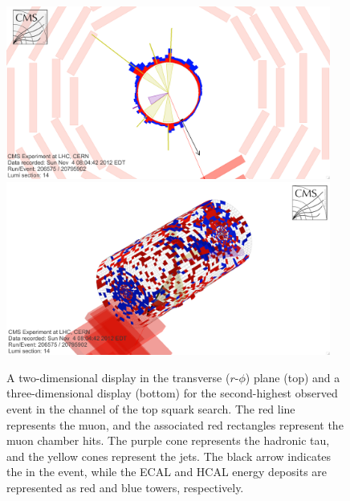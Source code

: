 \begin{figure}[hbtp]
\begin{center}
\includegraphics[width=0.95\textwidth]{figures/eventdisplays/LQD_evt2_rphi.png}
\includegraphics[width=0.95\textwidth]{figures/eventdisplays/LQD_evt2_3D.png}
\caption{A two-dimensional display in the transverse ($r$-$\phi$) plane (top) and a three-dimensional display (bottom) for the second-highest \ST observed event in the \mutau channel of the top squark search. The red line represents the muon, and the associated red rectangles represent the muon chamber hits. The purple cone represents the hadronic tau, and the yellow cones represent the jets. The black arrow indicates the \met in the event, while the ECAL and HCAL energy deposits are represented as red and blue towers, respectively. }
\label{fig:lqd-evt2}
\end{center}
\end{figure}